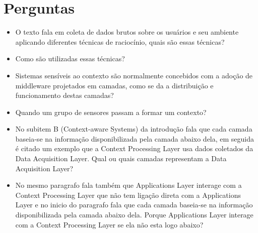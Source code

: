 \documentclass[12pt]{article} %
\begin{document}
\section{Perguntas} %

\begin{itemize}
	\item O texto fala em coleta de dados brutos sobre os usuários e seu ambiente aplicando diferentes técnicas de raciocínio, quais são essas técnicas? 
	\item Como são utilizadas essas técnicas?
	\item Sistemas sensíveis ao contexto são normalmente concebidos com a adoção de middleware projetados em camadas, como se da a distribuição e funcionamento destas camadas?
	\item Quando um grupo de sensores passam a formar um contexto?
	\item No subitem B (Context-aware Systems) da introdução fala que cada camada baseia-se na informação disponibilizada pela camada abaixo dela, em seguida é citado um exemplo que a Context Processing Layer usa dados coletados da Data Acquisition Layer. Qual ou quais camadas representam a Data Acquisition Layer?
	\item No mesmo paragrafo fala também que Applications Layer interage com a Context Processing Layer que não tem ligação direta com a Applications Layer e no inicio do paragrafo fala que cada camada baseia-se na informação disponibilizada pela camada abaixo dela. Porque Applications Layer interage com a Context Processing Layer se ela não esta logo abaixo?
\end{itemize}
\end{document}
